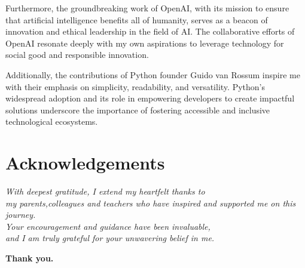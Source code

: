 \documentclass[12pt]{a4paper}{article}
\begin{document}
Furthermore, the groundbreaking work of OpenAI, with its mission to ensure that artificial intelligence benefits all of humanity, serves as a beacon of innovation and ethical leadership in the field of AI. The collaborative efforts of OpenAI resonate deeply with my own aspirations to leverage technology for social good and responsible innovation.

Additionally, the contributions of Python founder Guido van Rossum inspire me with their emphasis on simplicity, readability, and versatility. Python's widespread adoption and its role in empowering developers to create impactful solutions underscore the importance of fostering accessible and inclusive technological ecosystems.

\section*{Acknowledgements}

\vspace{1em}

\begin{flushright}
\textit{With deepest gratitude, I extend my heartfelt thanks to}\\
\textit{my parents,colleagues and teachers who have inspired and supported me on this journey.}\\
\textit{Your encouragement and guidance have been invaluable,}\\
\textit{and I am truly grateful for your unwavering belief in me.}
\end{flushright}

\vspace{1em}

\begin{center}
\textbf{Thank you.}
\end{center}
\end{document}

